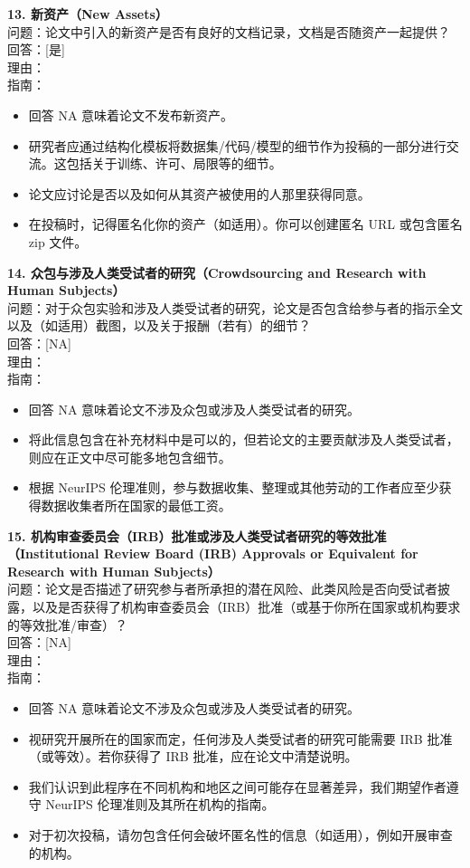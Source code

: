 \documentclass[11pt,UTF8,fontset=fandol]{ctexart}
\begin{document}
\textbf{13. 新资产（New Assets）}\\
问题：论文中引入的新资产是否有良好的文档记录，文档是否随资产一起提供？\\
回答：[是]\\
理由：\\
指南：
\begin{itemize}[leftmargin=1.5em,itemsep=1pt]
\item 回答 NA 意味着论文不发布新资产。
\item 研究者应通过结构化模板将数据集/代码/模型的细节作为投稿的一部分进行交流。这包括关于训练、许可、局限等的细节。
\item 论文应讨论是否以及如何从其资产被使用的人那里获得同意。
\item 在投稿时，记得匿名化你的资产（如适用）。你可以创建匿名 URL 或包含匿名 zip 文件。
\end{itemize}

\textbf{14. 众包与涉及人类受试者的研究（Crowdsourcing and Research with Human Subjects）}\\
问题：对于众包实验和涉及人类受试者的研究，论文是否包含给参与者的指示全文以及（如适用）截图，以及关于报酬（若有）的细节？\\
回答：[NA]\\
理由：\\
指南：
\begin{itemize}[leftmargin=1.5em,itemsep=1pt]
\item 回答 NA 意味着论文不涉及众包或涉及人类受试者的研究。
\item 将此信息包含在补充材料中是可以的，但若论文的主要贡献涉及人类受试者，则应在正文中尽可能多地包含细节。
\item 根据 NeurIPS 伦理准则，参与数据收集、整理或其他劳动的工作者应至少获得数据收集者所在国家的最低工资。
\end{itemize}

\textbf{15. 机构审查委员会（IRB）批准或涉及人类受试者研究的等效批准（Institutional Review Board (IRB) Approvals or Equivalent for Research with Human Subjects）}\\
问题：论文是否描述了研究参与者所承担的潜在风险、此类风险是否向受试者披露，以及是否获得了机构审查委员会（IRB）批准（或基于你所在国家或机构要求的等效批准/审查）？\\
回答：[NA]\\
理由：\\
指南：
\begin{itemize}[leftmargin=1.5em,itemsep=1pt]
\item 回答 NA 意味着论文不涉及众包或涉及人类受试者的研究。
\item 视研究开展所在的国家而定，任何涉及人类受试者的研究可能需要 IRB 批准（或等效）。若你获得了 IRB 批准，应在论文中清楚说明。
\item 我们认识到此程序在不同机构和地区之间可能存在显著差异，我们期望作者遵守 NeurIPS 伦理准则及其所在机构的指南。
\item 对于初次投稿，请勿包含任何会破坏匿名性的信息（如适用），例如开展审查的机构。
\end{itemize}
\end{document}
